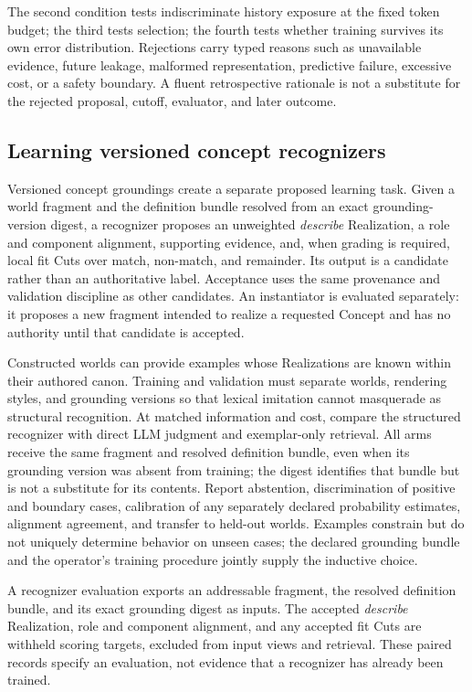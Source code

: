 \documentclass[10pt]{article}
\begin{document}
The second condition tests indiscriminate history exposure at the fixed token
budget; the third tests
selection; the fourth tests whether training survives its
own error distribution. Rejections carry typed reasons such as unavailable
evidence, future leakage, malformed representation, predictive failure,
excessive cost, or a safety boundary. A fluent retrospective rationale is not
a substitute for the rejected proposal, cutoff, evaluator, and later outcome.

\subsection{Learning versioned concept recognizers}

Versioned concept groundings create a separate proposed learning task. Given a world
fragment and the definition bundle resolved from an exact grounding-version
digest, a recognizer proposes an
unweighted \emph{describe} Realization, a role and component alignment,
supporting evidence, and, when grading is required, local fit Cuts over match,
non-match, and remainder. Its output is a candidate rather than an
authoritative label. Acceptance uses
the same provenance and validation discipline as other candidates. An
instantiator is evaluated separately: it proposes a new fragment intended to
realize a requested Concept and has no authority until that candidate is
accepted.

Constructed worlds can provide examples whose Realizations are known within
their authored canon. Training and validation must separate worlds, rendering
styles, and grounding versions so that lexical imitation cannot masquerade as
structural recognition. At matched information and cost, compare the structured
recognizer with direct LLM judgment and exemplar-only retrieval. All arms
receive the same fragment and resolved definition bundle, even when its
grounding version was absent from training; the digest identifies that bundle
but is not a substitute for its contents. Report
abstention, discrimination of positive and boundary cases, calibration of any
separately declared probability estimates, alignment agreement, and transfer to held-out worlds. Examples constrain but do
not uniquely determine behavior on unseen cases; the declared grounding bundle
and the operator's training procedure jointly supply the inductive choice.

A recognizer evaluation exports an addressable fragment, the resolved
definition bundle, and its exact grounding digest as inputs. The accepted
\emph{describe} Realization, role and component alignment, and any accepted fit
Cuts are withheld scoring targets, excluded from input views and retrieval.
These paired records specify an evaluation, not evidence that a recognizer
has already been trained.
\end{document}
